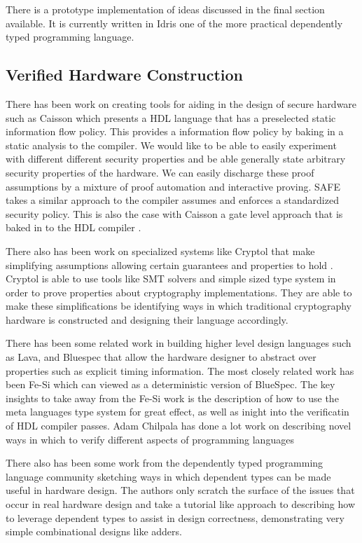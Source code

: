 \documentclass[12pt, titlepage]{article}
\begin{document}
There is a prototype implementation of ideas discussed in the final section available. It is currently
written in Idris one of the more practical dependently typed programming language.

\subsection{Verified Hardware Construction}

There has been work on creating tools for aiding in the design of secure hardware such as Caisson which presents a HDL 
language that has a preselected static information flow policy. This provides a information flow policy by baking in 
a static analysis to the compiler. We would like to be able to easily experiment with different different security 
properties and be able generally state arbitrary security properties of the hardware. We can easily discharge these
proof assumptions by a mixture of proof automation and interactive proving. SAFE takes a similar approach to the
compiler assumes and enforces a standardized security policy. This is also the case with Caisson a gate level 
approach that is baked in to the HDL compiler \cite{Li:2011:CHD:1993498.1993512}.

There also has been work on specialized systems like Cryptol that make simplifying assumptions allowing certain guarantees
and properties to hold \cite{cryptol2010}. Cryptol is able to use tools like SMT solvers and simple sized type system in
order to prove properties about cryptography implementations. They are able to make these simplifications be identifying 
ways in which traditional cryptography hardware is constructed and designing their language accordingly.

 There has been some related work in building higher level design languages such as Lava, and Bluespec
that allow the hardware designer to abstract over properties such as explicit timing information. The most closely related
work has been Fe-Si \cite{fesi} which can viewed as a deterministic version of BlueSpec. The key insights to take away from
the Fe-Si work is the description of how to use the meta languages type system for great effect, as well as inight into
the verificatin of HDL compiler passes. Adam Chilpala has done a lot work on describing novel ways in which to verify different
aspects of programming languages \cite{Chlipala:2007:CTC:1250734.1250742}\cite{chlipala2011certified}

There also has been some work from the dependently typed programming language community sketching ways in which dependent types
can be made useful in hardware design\cite{Brady_constructingcorrect}. The authors only scratch the surface of the issues that
occur in real hardware design and take a tutorial like approach to describing how to leverage dependent types to assist in 
design correctness, demonstrating very simple combinational designs like adders.
\end{document}
